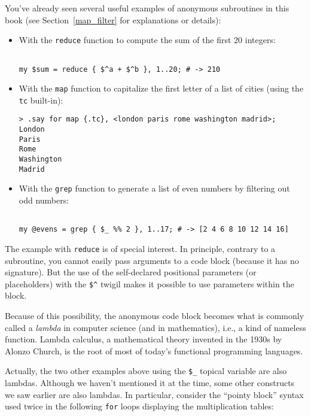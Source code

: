 You've already seen several useful examples of anonymous 
subroutines in this book (see Section~\ref{map_filter} 
for explanations or details):
\begin{itemize}
\item With the {\tt reduce} function to compute the sum of 
the first 20 integers:
\begin{verbatim}

my $sum = reduce { $^a + $^b }, 1..20; # -> 210
\end{verbatim}
\item With the {\tt map} function to capitalize the first 
letter of a list of cities (using the {\tt tc} built-in):
\begin{verbatim}
> .say for map {.tc}, <london paris rome washington madrid>;
London
Paris
Rome
Washington
Madrid
\end{verbatim}
\item With the {\tt grep} function to generate a list of even 
numbers by filtering out odd numbers:
\begin{verbatim}

my @evens = grep { $_ %% 2 }, 1..17; # -> [2 4 6 8 10 12 14 16]
\end{verbatim}
\end{itemize} 

The example with {\tt reduce} is of special interest. In 
principle, contrary to a subroutine, you cannot easily pass 
arguments to a code block (because it has no signature). 
But the use of the self-declared positional parameters 
(or placeholders) with the \verb'$^' twigil makes it 
possible to use parameters within the block. 

Because of this possibility, the anonymous code block becomes 
what is commonly called a \emph{lambda} in computer science (and 
in mathematics), i.e., a kind of nameless function. Lambda 
calculus, a mathematical theory invented in the 1930s by 
Alonzo Church, is the root of most of today's functional 
programming languages.

Actually, the two other examples above using the \verb'$_' 
topical variable are also lambdas. Although we haven't 
mentioned it at the time, some other constructs we saw 
earlier are also lambdas. In particular, consider the 
``pointy block'' syntax used twice in the following 
{\tt for} loops displaying the multiplication tables:


